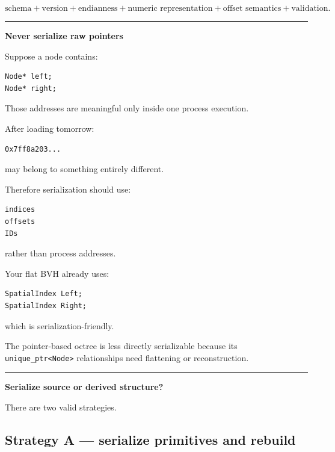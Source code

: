 \[
\boxed{
\text{schema}
+
\text{version}
+
\text{endianness}
+
\text{numeric representation}
+
\text{offset semantics}
+
\text{validation}.
}
\]

\begin{center}\rule{0.5\linewidth}{0.5pt}\end{center}

\textbf{Never serialize raw pointers}

Suppose a node contains:

\begin{verbatim}
Node* left;
Node* right;
\end{verbatim}

Those addresses are meaningful only inside one process execution.

After loading tomorrow:

\begin{verbatim}
0x7ff8a203...
\end{verbatim}

may belong to something entirely different.

Therefore serialization should use:

\begin{verbatim}
indices
offsets
IDs
\end{verbatim}

rather than process addresses.

Your flat BVH already uses:

\begin{verbatim}
SpatialIndex Left;
SpatialIndex Right;
\end{verbatim}

which is serialization-friendly.

The pointer-based octree is less directly serializable because its \texttt{unique\_ptr\textless{}Node\textgreater{}} relationships need flattening or reconstruction.

\begin{center}\rule{0.5\linewidth}{0.5pt}\end{center}

\textbf{Serialize source or derived structure?}

There are two valid strategies.

\subsection{Strategy A --- serialize primitives and rebuild}\label{06-engine-ii-ch031-strategy-a-serialize-primitives-and-rebuild}

